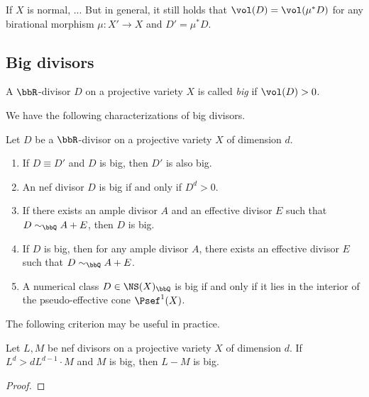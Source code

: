   \begin{remark}
    If $X$ is normal, ... \Yang{}
    But in general, it still holds that $\vol(D) = \vol(\mu^* D)$ for any birational morphism $\mu: X' \to X$ and $D' = \mu^* D$.
     \Yang{}
  \end{remark}

\subsection{Big divisors}

  \begin{definition}
    A $\bbR$-divisor $D$ on a projective variety $X$ is called \emph{big} if $\vol(D) > 0$.
  \end{definition}

  We have the following characterizations of big divisors.

  \begin{theorem}
    Let $D$ be a $\bbR$-divisor on a projective variety $X$ of dimension $d$.
    \begin{enumerate}
      \item If $D \equiv D'$ and $D$ is big, then $D'$ is also big.
      \item An nef divisor $D$ is big if and only if $D^d > 0$.
      \item If there exists an ample divisor $A$ and an effective divisor $E$ such that $D \sim_\bbQ A + E$, then $D$ is big.
      \item If $D$ is big, then for any ample divisor $A$, there exists an effective divisor $E$ such that $D \sim_\bbQ A + E$.
      \item A numerical class $D \in \NS(X)_\bbQ$ is big if and only if it lies in the interior of the pseudo-effective cone $\Psef^1(X)$.
    \end{enumerate}
  \end{theorem}

  The following criterion may be useful in practice.

  \begin{theorem}
    Let $L,M$ be nef divisors on a projective variety $X$ of dimension $d$.
    If $L^d > d L^{d-1} \cdot M$ and $M$ is big, then $L - M$ is big.
  \end{theorem}
  \begin{proof}
    \Yang{}
  \end{proof}



